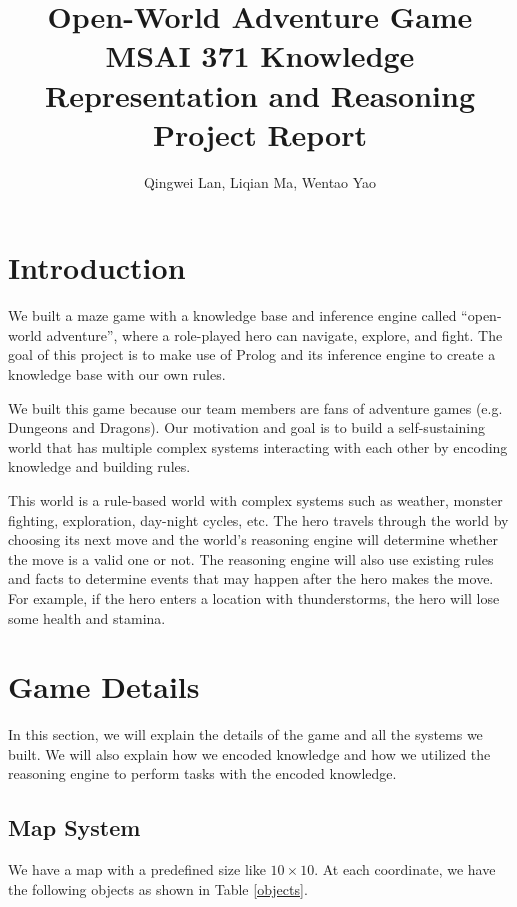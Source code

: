 \documentclass[10pt]{article}
\title{
    Open-World Adventure Game \\[.5cm]
    \normalsize MSAI 371 Knowledge Representation and Reasoning Project Report
}
\author{Qingwei Lan, Liqian Ma, Wentao Yao}
\begin{document}
\maketitle

\section{Introduction}

We built a maze game with a knowledge base and inference engine called “open-world adventure”, where a role-played hero can navigate, explore, and fight. The goal of this project is to make use of Prolog \cite{swiprolog} and its inference engine to create a knowledge base with our own rules.

We built this game because our team members are fans of adventure games (e.g. Dungeons and Dragons). Our motivation and goal is to build a self-sustaining world that has multiple complex systems interacting with each other by encoding knowledge and building rules.

This world is a rule-based world with complex systems such as weather, monster fighting, exploration, day-night cycles, etc. The hero travels through the world by choosing its next move and the world's reasoning engine will determine whether the move is a valid one or not. The reasoning engine will also use existing rules and facts to determine events that may happen after the hero makes the move. For example, if the hero enters a location with thunderstorms, the hero will lose some health and stamina.



\section{Game Details}

In this section, we will explain the details of the game and all the systems we built. We will also explain how we encoded knowledge and how we utilized the reasoning engine to perform tasks with the encoded knowledge.


\subsection{Map System}

We have a map with a predefined size like $10 \times 10$. At each coordinate, we have the following objects as shown in Table \ref{objects}.
\end{document}
